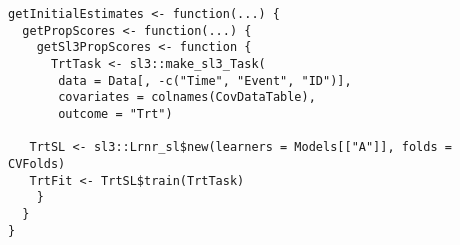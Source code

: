 \documentclass{report}
\newcommand{\1}{\ensuremath{\mathbf{1}}}
\begin{document}
\begin{lstlisting}
getInitialEstimates <- function(...) {
  getPropScores <- function(...) {
    getSl3PropScores <- function {
      TrtTask <- sl3::make_sl3_Task(
       data = Data[, -c("Time", "Event", "ID")],
       covariates = colnames(CovDataTable),
       outcome = "Trt")

   TrtSL <- sl3::Lrnr_sl$new(learners = Models[["A"]], folds = CVFolds)
   TrtFit <- TrtSL$train(TrtTask)
    }
  }
}
\end{lstlisting}
\end{document}
